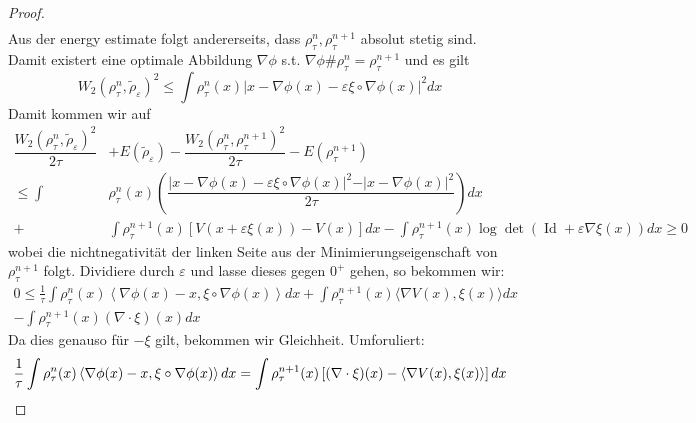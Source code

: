 \documentclass[11pt,a4paper,notitlepage]{scrreprt}
\begin{document}
\begin{proof}
\begin{eqnarray}
\end{eqnarray}
Aus der energy estimate folgt andererseits, dass $\rho_\tau^n, \rho_\tau^{n+1}$ absolut stetig sind. Damit existert eine optimale Abbildung $\nabla \phi$ s.t. $\nabla \phi \# \rho_\tau^n=\rho_\tau^{n+1}$ und es gilt
\begin{equation*}
W_2(\rho_\tau^n,\tilde{\rho}_\varepsilon)^2 \leq \int \rho_\tau^n(x)\vert x-\nabla \phi(x)-\varepsilon\xi\circ\nabla\phi(x)\vert^2dx
\end{equation*}
Damit kommen wir auf
\begin{align}
\dfrac{W_2(\rho_\tau^n,\tilde{\rho}_\varepsilon)^2}{2\tau}&+E(\tilde{\rho}_\varepsilon)-\dfrac{W_2(\rho_\tau^n,\rho_\tau^{n+1})^2}{2\tau}-E(\rho_\tau^{n+1})\\
\leq\int&\rho_\tau^n(x)\left(\dfrac{\vert x-\nabla \phi(x)-\varepsilon\xi\circ\nabla\phi(x)\vert^2-\vert x-\nabla\phi(x)\vert^2}{2\tau}\right)dx\\
+&\int\rho_\tau^{n+1}(x)[V(x+\varepsilon\xi(x))-V(x)]dx-\int\rho_\tau^{n+1}(x)\log \det(\operatorname{Id}+\varepsilon\nabla\xi(x))dx\geq 0
\end{align}
wobei die nichtnegativität der linken Seite aus der Minimierungseigenschaft von $\rho_\tau^{n+1}$ folgt.
Dividiere durch $\varepsilon$ und lasse dieses gegen $0^+$ gehen, so bekommen wir: 
\begin{align*}
0\leq\frac{1}{\tau} \int \rho_\tau^n(x)\left\langle\nabla\phi(x)-x,\xi\circ\nabla\phi(x)\right\rangle dx+\int\rho_\tau^{n+1}(x)\langle\nabla V(x),\xi(x)\rangle dx\\-\int\rho_\tau^{n+1}(x)(\nabla\cdot \xi)(x)dx
\end{align*}
Da dies genauso für $-\xi$ gilt, bekommen wir Gleichheit. Umforuliert:
\begin{equation}
\frac{1}{\tau} \int \rho_\tau^n(x)\left\langle\nabla\phi(x)-x,\xi\circ\nabla\phi(x)\right\rangle dx\\=\int\rho_\tau^{n+1}(x)\left[(\nabla\cdot \xi)(x)-\langle\nabla V(x),\xi(x)\rangle \right]dx \label{eqwithxi}
\end{equation}


\end{proof}
\end{document}
